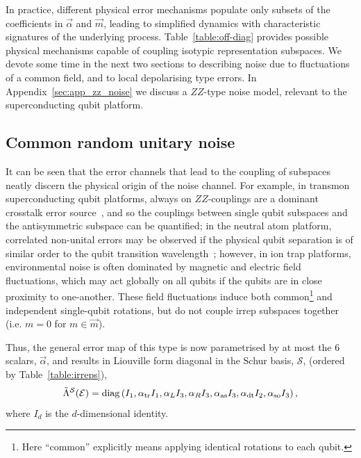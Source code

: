 In practice, different physical error mechanisms populate only subsets of the coefficients in $\vec\alpha$ and $\vec m$, leading to simplified dynamics with characteristic signatures of the underlying process. Table~\ref{table:off-diag} provides possible physical mechanisms capable of coupling isotypic representation subspaces. We devote some time in the next two sections to describing noise due to fluctuations of a common field, and to local depolarising type errors. In Appendix~\ref{sec:app_zz_noise} we discuss a $ZZ$-type noise model, relevant to the superconducting qubit platform.

\subsection{Common random unitary noise}
\label{sec:common_noise}
It can be seen that the error channels that lead to the coupling of subspaces neatly discern the physical origin of the noise channel. For example, in transmon superconducting qubit platforms, always on $ZZ$-couplings are a dominant crosstalk error source~\cite{zhao_quantum_2022, fors_comprehensive_2024, alghadeer_crosstalk_2026}, and so the couplings between single qubit subspaces and the antisymmetric subspace can be quantified; in the neutral atom platform, correlated non-unital errors may be observed if the physical qubit separation is of similar order to the qubit transition wavelength~\cite{rivas_quantifying_2015}; however, in ion trap platforms, environmental noise is often dominated by magnetic and electric field fluctuations, which may act globally on all qubits if the qubits are in close proximity to one-another. These field fluctuations induce both common\footnote{Here ``common'' explicitly means applying identical rotations to each qubit.} and independent single-qubit rotations, but do not couple irrep subspaces together (i.e. $m =0$ for $m\in \vec m$). 

Thus, the general error map of this type is now parametrised by at most the $6$ scalars, $\vec\alpha$, and results
in Liouville form diagonal in the Schur basis, $\mathcal{S}$, (ordered by Table~\ref{table:irreps}),
\begin{equation}\label{eqn:Liouville}
    \tilde\Lambda^\mathcal{S}(\mathcal{E}) = \mathrm{diag}\left(
    I_1, 
    \alpha_{\rm tr} I_1, 
    \alpha_{L} I_3, 
    \alpha_{R} I_3, 
    \alpha_{\rm as} I_3,
    \alpha_{\rm dt} I_2, 
    \alpha_{\rm so} I_3\right), 
\end{equation}
where $I_d$ is the $d$-dimensional identity.

